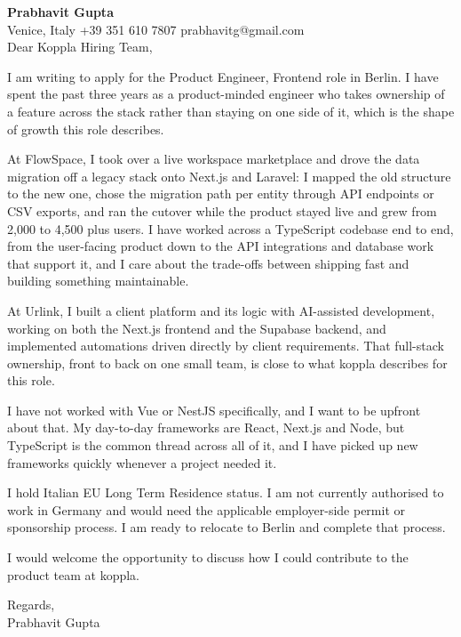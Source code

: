 \documentclass[a4paper,10.5pt]{article}
\begin{document}
\textbf{Prabhavit Gupta}\\
Venice, Italy \textbar{} +39 351 610 7807 \textbar{} prabhavitg@gmail.com\\[10pt]
Dear Koppla Hiring Team,

I am writing to apply for the Product Engineer, Frontend role in Berlin. I have spent the past three years as a product-minded engineer who takes ownership of a feature across the stack rather than staying on one side of it, which is the shape of growth this role describes.

At FlowSpace, I took over a live workspace marketplace and drove the data migration off a legacy stack onto Next.js and Laravel: I mapped the old structure to the new one, chose the migration path per entity through API endpoints or CSV exports, and ran the cutover while the product stayed live and grew from 2,000 to 4,500 plus users. I have worked across a TypeScript codebase end to end, from the user-facing product down to the API integrations and database work that support it, and I care about the trade-offs between shipping fast and building something maintainable.

At Urlink, I built a client platform and its logic with AI-assisted development, working on both the Next.js frontend and the Supabase backend, and implemented automations driven directly by client requirements. That full-stack ownership, front to back on one small team, is close to what koppla describes for this role.

I have not worked with Vue or NestJS specifically, and I want to be upfront about that. My day-to-day frameworks are React, Next.js and Node, but TypeScript is the common thread across all of it, and I have picked up new frameworks quickly whenever a project needed it.

I hold Italian EU Long Term Residence status. I am not currently authorised to work in Germany and would need the applicable employer-side permit or sponsorship process. I am ready to relocate to Berlin and complete that process.

I would welcome the opportunity to discuss how I could contribute to the product team at koppla.

Regards,\\
Prabhavit Gupta
\end{document}

